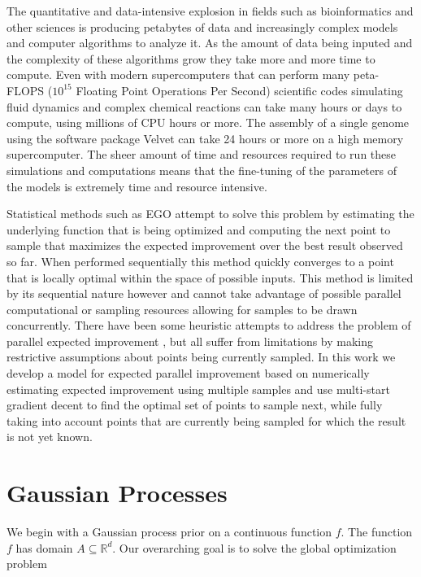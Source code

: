 \documentclass[phd,tocprelim]{cornell}
\begin{document}
The quantitative and data-intensive explosion in fields such as bioinformatics and other sciences is producing petabytes of data and increasingly complex models and computer algorithms to analyze it. As the amount of data being inputed and the complexity of these algorithms grow they take more and more time to compute. Even with modern supercomputers that can perform many peta-FLOPS ($10^{15}$ Floating Point Operations Per Second) \cite{Hopper} scientific codes simulating fluid dynamics \cite{Compo2011} and complex chemical reactions \cite{Valiev2010} can take many hours or days to compute, using millions of CPU hours or more. The assembly of a single genome using the software package Velvet \cite{Zerbino2008} can take 24 hours or more on a high memory supercomputer. The sheer amount of time and resources required to run these simulations and computations means that the fine-tuning of the parameters of the models is extremely time and resource intensive.

Statistical methods such as EGO \cite{Jones1998} attempt to solve this problem by estimating the underlying function that is being optimized and computing the next point to sample that maximizes the expected improvement over the best result observed so far. When performed sequentially this method quickly converges to a point that is locally optimal within the space of possible inputs. This method is limited by its sequential nature however and cannot take advantage of possible parallel computational or sampling resources allowing for samples to be drawn concurrently. There have been some heuristic attempts to address the problem of parallel expected improvement \cite{Ginsbourger2008}, but all suffer from limitations by making restrictive assumptions about points being currently sampled. In this work we develop a model for expected parallel improvement based on numerically estimating expected improvement using multiple samples and use multi-start gradient decent to find the optimal set of points to sample next, while fully taking into account points that are currently being sampled for which the result is not yet known.

\section{Gaussian Processes}

We begin with a Gaussian process prior on a continuous function $f$. The function $f$ has domain $A \subseteq \mathbb{R}^{d}$. Our overarching goal is to solve the global optimization problem
\end{document}
